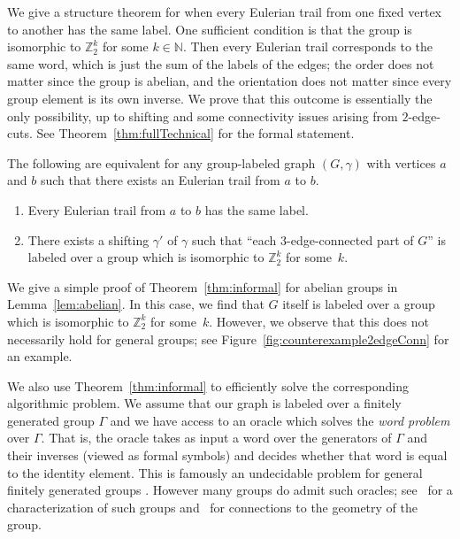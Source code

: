 \documentclass[a4paper, 12pt]{article}
\begin{document}
We give a structure theorem for when every Eulerian trail from one fixed vertex to another has the same label. One sufficient condition is that the group is isomorphic to $\mathbb{Z}_2^k$ for some $k \in \mathbb{N}$. Then every Eulerian trail corresponds to the same word, which is just the sum of the labels of the edges; the order does not matter since the group is abelian, and the orientation does not matter since every group element is its own inverse. We prove that this outcome is essentially the only possibility, up to shifting and some connectivity issues arising from $2$-edge-cuts. See Theorem~\ref{thm:fullTechnical} for the formal statement.

\begin{theorem}
\label{thm:informal}
The following are equivalent for any group-labeled graph $(G, \gamma)$ with vertices $a$ and $b$ such that there exists an Eulerian trail from $a$ to $b$.\begin{enumerate}
\item Every Eulerian trail from $a$ to $b$ has the same label.
\item There exists a shifting $\gamma'$ of $\gamma$ such that ``each $3$-edge-connected part of $G$'' is labeled over a group which is isomorphic to $\mathbb{Z}_2^k$ for some~$k$. 
\end{enumerate}
\end{theorem}

We give a simple proof of Theorem~\ref{thm:informal} for abelian groups in Lemma~\ref{lem:abelian}. In this case, we find that $G$ itself is labeled over a group which is isomorphic to $\mathbb{Z}_2^k$ for some~$k$. However, we observe that this does not necessarily hold for general groups; see Figure~\ref{fig:counterexample2edgeConn} for an example.

We also use Theorem~\ref{thm:informal} to efficiently solve the corresponding algorithmic problem. We assume that our graph is labeled over a finitely generated group $\Gamma$ and we have access to an oracle which solves the \emph{word problem} over $\Gamma$. That is, the oracle takes as input a word over the generators of $\Gamma$ and their inverses (viewed as formal symbols) and decides whether that word is equal to the identity element. This is famously an undecidable problem for general finitely generated groups \cite{BooneWordProblem,NovikovWordProblem}. However many groups do admit such oracles; see~\cite{BooneHigman1974} for a characterization of such groups and~\cite{wordProblemBook} for connections to the geometry of the group. 
\end{document}
